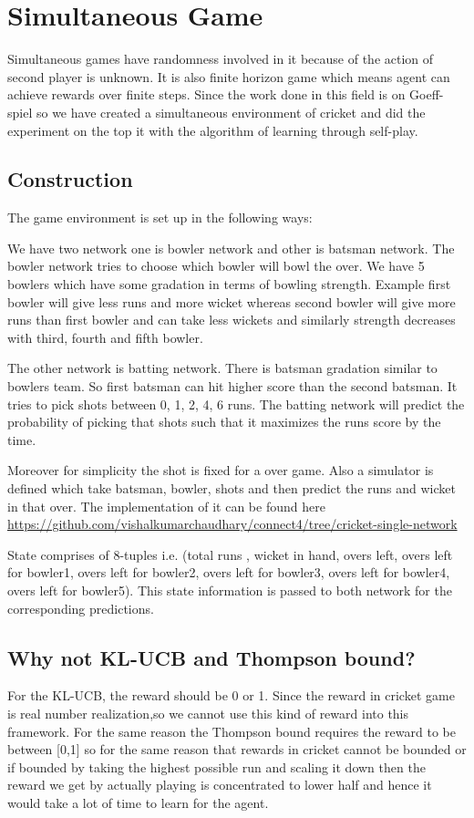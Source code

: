 \chapter{Simultaneous Game}
Simultaneous games have randomness involved in it because of the action of second player is unknown. It is also finite horizon game which means agent can achieve rewards over finite steps. Since the work done in this field is on  Goeff-spiel so we have created a simultaneous environment of cricket and did the experiment on the top it with the algorithm of learning through self-play.

\section{Construction }
The game environment is set up in the following ways: 


We have two network one is bowler network and other is batsman network. The bowler network tries to choose which  bowler will bowl the  over. We have 5 bowlers which have some gradation in terms of bowling strength. Example first bowler will give less runs and more wicket whereas second bowler will give more runs than first bowler and can take less wickets and similarly strength decreases with third, fourth and fifth bowler.

The other network is batting network. There is batsman gradation similar to bowlers team. So first batsman can hit higher score than the second batsman. It tries to pick shots between 0, 1, 2, 4, 6 runs. The batting network will predict the probability of picking that shots such that it maximizes the runs score by the time. 

Moreover for simplicity the shot is fixed for a over game. Also  a simulator is defined which take batsman, bowler, shots and then predict the runs and wicket in that over. The implementation of it can be found here \url{https://github.com/vishalkumarchaudhary/connect4/tree/cricket-single-network}

State comprises of 8-tuples i.e. (total runs , wicket in hand, overs left, overs left for bowler1, overs left for bowler2, overs left for bowler3, overs left for bowler4, overs left for bowler5).
This state information is passed to both network for the corresponding predictions.


\section{Why not KL-UCB and Thompson bound?}
For the KL-UCB, the reward should be 0 or 1. Since the reward in cricket game is real number realization,so  we cannot use this kind of reward into this framework. For the same reason the Thompson bound requires the reward to be between [0,1] so for the same reason that rewards in cricket cannot be bounded or if bounded by taking the highest possible run and scaling it down then the reward we get by actually playing is concentrated to lower half and hence it would take a lot of time to learn for the agent.



